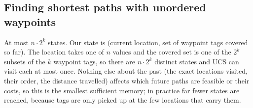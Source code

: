 \subsection{Finding shortest paths with unordered waypoints}


\begin{solution}
At most $\boxed{n\cdot 2^{k}}$ states. Our state is (current location, set of waypoint tags covered so far).
The location takes one of $n$ values and the covered set is one of the $2^k$ subsets of the $k$ waypoint
tags, so there are $n\cdot2^k$ distinct states and UCS can visit each at most once. Nothing else about the
past (the exact locations visited, their order, the distance travelled) affects which future paths are
feasible or their costs, so this is the smallest sufficient memory; in practice far fewer states are reached,
because tags are only picked up at the few locations that carry them.
\end{solution}

